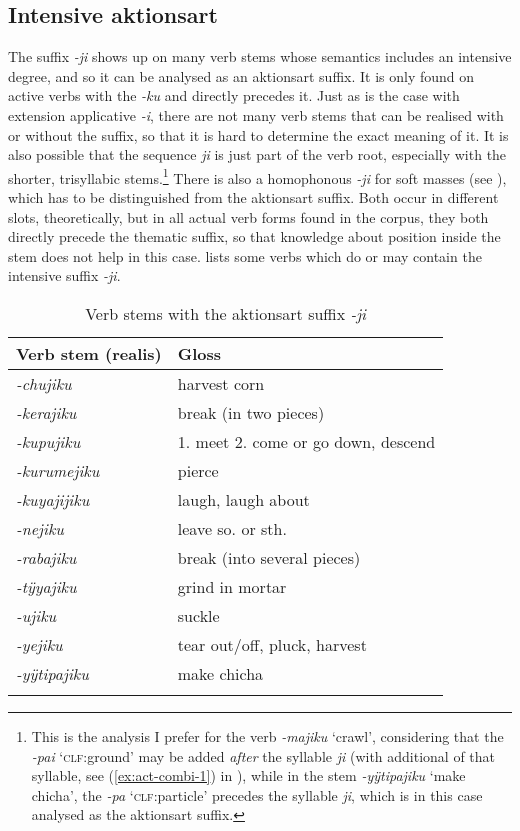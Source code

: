 \subsection{Intensive aktionsart}\label{sec:IntensiveAktionsart}

The suffix \textit{-ji} shows up on many verb stems whose semantics includes an intensive degree, and so it can be analysed as an aktionsart suffix. It is only found on active verbs with the  \textit{-ku} and directly precedes it. Just as is the case with extension applicative \textit{-i}, there are not many verb stems that can be realised with or without the suffix, so that it is hard to determine the exact meaning of it. It is also possible that the sequence \textit{ji} is just part of the verb root, especially with the shorter, trisyllabic stems.\footnote{This is the analysis I prefer for the verb \textit{-majiku} ‘crawl’, considering that the  \textit{-pai} ‘\textsc{clf:}ground’ may be added \textit{after} the syllable \textit{ji} (with additional  of that syllable, see (\ref{ex:act-combi-1}) in ), while in the stem \textit{-yÿtipajiku} ‘make chicha’, the  \textit{-pa} ‘\textsc{clf:}particle’ precedes the syllable \textit{ji}, which is in this case analysed as the aktionsart suffix.} There is also a homophonous \textit{-ji} for soft masses (see ), which has to be distinguished from the aktionsart suffix. Both occur in different slots, theoretically, but in all actual verb forms found in the corpus, they both directly precede the thematic suffix, so that knowledge about position inside the stem does not help in this case.  lists some verbs which do or may contain the intensive suffix \textit{-ji}.

\begin{table}
\caption{Verb stems with the aktionsart suffix \textit{-ji}}

\begin{tabular}{ll}
\lsptoprule
Verb stem (realis) & Gloss \\
\midrule
\textit{-chujiku} & harvest corn\\
\textit{-kerajiku} &  break (in two pieces)\\
\textit{-kupujiku} &  1. meet 2. come or go down, descend\\
\textit{-kurumejiku} &  pierce\\
\textit{-kuyajijiku} &  laugh, laugh about\\
\textit{-nejiku} &  leave so. or sth.\\
\textit{-rabajiku} &  break (into several pieces) \\
\textit{-tÿyajiku} &  grind in mortar\\
\textit{-ujiku} &  suckle\\
\textit{-yejiku} &  tear out/off, pluck, harvest\\
\textit{-yÿtipajiku} &  make chicha\\
\lspbottomrule
\end{tabular}

\label{table:AKT-ji}
\end{table}



